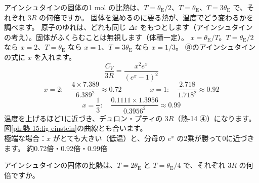 \label{ph:熱-15:ex9}
\begin{phreidai}[アインシュタインの固体の比熱]
アインシュタインの固体の1 mol の比熱は、$T=\theta_{\mathrm E}/2$、$T=\theta_{\mathrm E}$、$T=3\theta_{\mathrm E}$ で、それぞれ $3R$ の何倍ですか。
\phbamen
固体を温めるのに要る熱が、温度でどう変わるかを調べます。
\phmushi
原子のゆれは、どれも同じ $\Delta\varepsilon$ をもつとします（アインシュタインの考え）。固体がふくらむことは無視します（体積一定）。
\phzu
$x=\theta_{\mathrm E}/T$。$T=\theta_{\mathrm E}/2$ なら $x=2$、$T=\theta_{\mathrm E}$ なら $x=1$、$T=3\theta_{\mathrm E}$ なら $x=1/3$。
\phriyu
⑧のアインシュタインの式に $x$ を入れます。
\phtateru
\[\frac{C_V}{3R}=\frac{x^2e^x}{(e^x-1)^2}\]
\phtoku
\[x=2:\quad\frac{4\times7.389}{6.389^2}\approx0.72\qquad\qquad x=1:\quad\frac{2.718}{1.718^2}\approx0.92\]
\[x=\frac{1}{3}:\quad\frac{0.1111\times1.3956}{0.3956^2}\approx0.99\]
\phtashikame
温度を上げるほど1に近づき、デュロン・プティの $3R$（熱-14 ④）になります。図\ref{ph:熱-15:fig-einstein}の曲線とも合います。\\
極端な場合：$x$ がとても大きい（低温）と、分母の $e^x$ の2乗が勝って0に近づきます。
\kotae 約0.72倍・0.92倍・0.99倍
\end{phreidai}
\begin{jibun}
アインシュタインの固体の比熱は、$T=2\theta_{\mathrm E}$ と $T=\theta_{\mathrm E}/4$ で、それぞれ $3R$ の何倍ですか。
\end{jibun}

